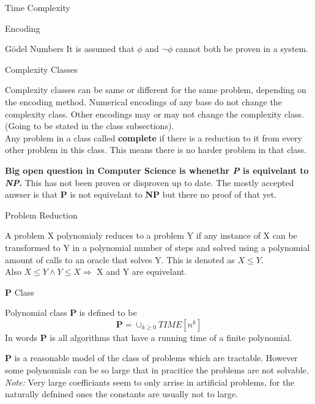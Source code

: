 \documentclass[12pt, letterpaper]{article}
\begin{document}
\begin{section}{Time Complexity}
\begin{subsection}{Encoding}
\begin{subsubsection}{Gödel Numbers}
      It is assumed that \(\phi\) and \(\lnot \phi\) cannot both be proven in a system.
      
    \end{subsubsection}

  \end{subsection}

  \begin{subsection}{Complexity Classes}

    Complexity classes can be same or different for the same problem, depending
    on the encoding method. Numerical encodings of any base do not change the
    complexity class. Other encodings may or may not change the complexity class.
    (Going to be stated in the class subsections). \\
    Any problem in a class called \textbf{complete} if there is a reduction
    to it from every other problem in this class. This means there is no harder
    problem in that class.

    \textbf{Big open question in Computer Science is whenethr
      \emph{P} is equivelant to \emph{NP}.} This has not been proven
    or disproven up to date. The mostly accepted anwser is that
    \textbf{P} is not equivelant to \textbf{NP} but there no
    proof of that yet.

    \begin{subsubsection}{Problem Reduction}

      A problem X polynomialy reduces to a problem Y if any instance of X can
      be transformed to Y in a polynomial number of steps and solved using
      a polynomial amount of calls to an oracle that solves Y. This is denoted as
      \(X \leq Y\). \\
      Also \(X \leq Y \land Y \leq X \Rightarrow\) X and Y are equivelant.

    \end{subsubsection}

    \begin{subsubsection}{\textbf{P} Class}

      Polynomial class \textbf{P} is defined to be
      \[\textbf{P} = \cup_{k \geq 0} TIME[n^{k}]\]
      In words \textbf{P} is all algorithms that have a running time
      of a finite polynomial.

      \textbf{P} is a reasonable model of the class of problems which are
      tractable. However some polynomials can be so large that in pracitice the
      problems are not solvable. \textit{Note:} Very large coefficiants seem to
      only arrise in artificial problems, for the naturally defnined ones the constants
      are usually not to large.


\end{subsubsection}
\end{subsection}
\end{section}
\end{document}
